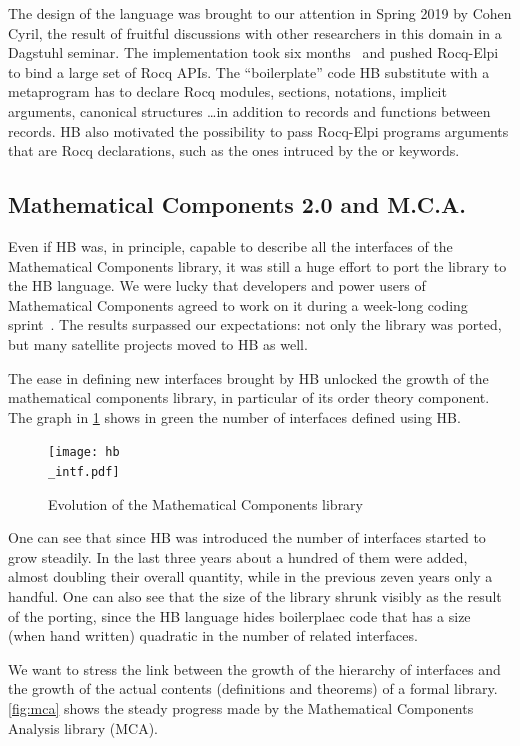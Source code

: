 \documentclass[a4paper, 11pt]{book}
\begin{document}
The design of the language was brought to our attention in Spring 2019
by Cohen Cyril, the result of fruitful discussions with other
researchers in this domain in a Dagstuhl seminar. The implementation
took six months~\cite{cohen_et_al:LIPIcs.FSCD.2020.34} and pushed
Rocq-Elpi to bind a large set of Rocq APIs. The ``boilerplate'' code
HB substitute with a metaprogram has to declare Rocq modules, sections,
notations, implicit arguments, canonical structures \ldots in addition
to records and functions between records. HB also motivated the possibility
to pass Rocq-Elpi programs arguments that are Rocq declarations, such as the ones intruced by
the  or  keywords.


\subsection{Mathematical Components 2.0 and M.C.A.}

Even if HB was, in principle, capable to describe all the interfaces of
the Mathematical Components library, it was still a huge effort to port the
library to the HB language.  We were lucky that developers and power users of
Mathematical Components agreed to work on it during a week-long coding
sprint~\cite{affeldt:hal-03463762}. The results surpassed our expectations:
not only the library was ported, but many satellite projects moved to
HB as well.

The ease in defining new interfaces brought by HB unlocked 
the growth of the mathematical components library, in particular of
its order theory component. The graph in \cref{fig:mc} shows in green the
number of interfaces defined using HB.

\begin{figure}[!ht]
\texttt{[image: hb\\\_intf.pdf]}
\caption{Evolution of the Mathematical Components library\label{fig:mc}}
\end{figure}

One can see that since HB was introduced the number of
interfaces started to grow steadily. In the last three years about a hundred
of them were added, almost doubling their overall quantity,
while in the previous zeven years only a handful.
One can also see that the size of the library shrunk visibly as the result of
the porting, since the HB language hides boilerplaec code that has a size
(when hand written) quadratic in the number of related interfaces.

We want to stress the link between the growth of the hierarchy of interfaces and
the growth of the actual contents (definitions and theorems) of a formal
library. \cref{fig:mca} shows the steady progress made by the
Mathematical Components Analysis library (MCA).
\end{document}
